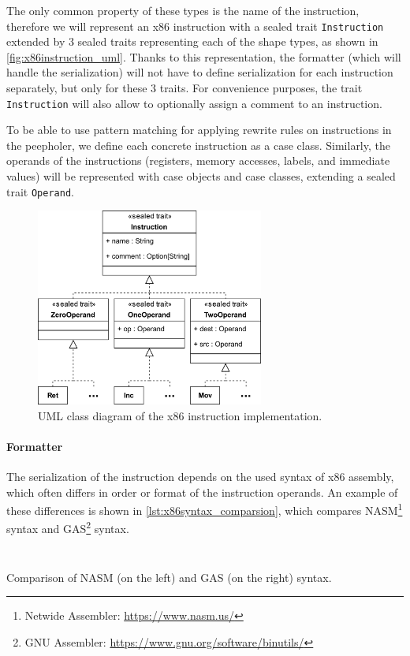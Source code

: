 \documentclass[thesis=M,english]{FITthesis}[2019/12/23]
\begin{document}
The only common property of these types is the name of the instruction, therefore we will represent an x86 instruction with a sealed trait \texttt{Instruction} extended by 3 sealed traits representing each of the shape types, as shown in \autoref{fig:x86instruction_uml}. Thanks to this representation, the formatter (which will handle the serialization) will not have to define serialization for each instruction separately, but only for these 3 traits. For convenience purposes, the trait \texttt{Instruction} will also allow to optionally assign a comment to an instruction.

To be able to use pattern matching for applying rewrite rules on instructions in the peepholer, we define each concrete instruction as a case class. Similarly, the operands of the instructions (registers, memory accesses, labels, and immediate values) will be represented with case objects and case classes, extending a sealed trait \texttt{Operand}.

\begin{figure}
    \centering
    \includegraphics[height=6.5cm]{img/instruction_uml.png}
    \caption{UML class diagram of the x86 instruction implementation.}\label{fig:x86instruction_uml}
\end{figure}

\paragraph*{Formatter} The serialization of the instruction depends on the used syntax of x86 assembly, which often differs in order or format of the instruction operands. An example of these differences is shown in \autoref{lst:x86syntax_comparsion}, which compares NASM\footnote{Netwide Assembler: \url{https://www.nasm.us/}} syntax and GAS\footnote{GNU Assembler: \url{https://www.gnu.org/software/binutils/}} syntax.

\begin{listing}[H]
\centering
\begin{minipage}{.4\linewidth}
	\inputminted[tabsize=2,breaklines,bgcolor=codebg]{nasm}{snippets/nasm.m}
\end{minipage}%
\hskip0.2cm
\begin{minipage}{.5\linewidth}
	\inputminted[tabsize=2,breaklines,bgcolor=codebg]{gas}{snippets/gas.m}
\end{minipage}%
	\caption[Comparison of NASM and GAS syntax.]{Comparison of NASM (on the left) and GAS (on the right) syntax.}
	\label{lst:x86syntax_comparsion}
\end{listing}
\end{document}
